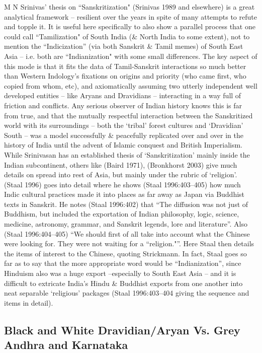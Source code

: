 M N Srinivas’ thesis on “Sanskritization" (Srinivas 1989 and elsewhere) is a great analytical framework – resilient over the years in spite of many attempts to refute and topple it. It is useful here specifically to also show a parallel process that one could call “Tamilization" of South India (\& North India to some extent), not to mention the “Indicization” (via both Sanskrit \& Tamil memes) of South East Asia -- i.e. both are “Indianization" with some small differences. The key aspect of this mode is that it fits the data of Tamil-Sanskrit interactions so much better than Western Indology’s fixations on origins and priority (who came first, who copied from whom, etc), and axiomatically assuming two utterly independent well developed entities – like Aryans and Dravidians – interacting in a way full of friction and conflicts. Any serious observer of Indian history knows this is far from true, and that the mutually respectful interaction between the Sanskritized world with its surroundings – both the ‘tribal’ forest cultures and ‘Dravidian’ South – was a model successfully \& peacefully replicated over and over in the history of India until the advent of Islamic conquest and British Imperialism. While Srinivasan has an established thesis of ‘Sanskritization’ mainly inside the Indian subcontinent, others like (Baird 1971), (Bronkhorst 2003) give much details on spread into rest of Asia, but mainly under the rubric of ‘religion’. (Staal 1996) goes into detail where he shows (Staal 1996:403–405) how much Indic cultural practices made it into places as far away as Japan via Buddhist texts in Sanskrit. He notes (Staal 1996:402) that “The diffusion was not just of Buddhism, but included the exportation of Indian philosophy, logic, science, medicine, astronomy, grammar, and Sanskrit legends, lore and literature”. Also (Staal 1996:404–405) “We should first of all take into account what the Chinese were looking for. They were not waiting for a “religion."”. Here Staal then details the items of interest to the Chinese, quoting Strickmann. In fact, Staal goes so far as to say that the more appropriate word would be “Indianization”, since Hinduism also was a huge export –especially to South East Asia – and it is difficult to extricate India’s Hindu \& Buddhist exports from one another into neat separable ‘religious’ packages (Staal 1996:403–404 giving the sequence and items in detail).


\subsection*{Black and White Dravidian/Aryan Vs. Grey Andhra and Karnataka}


